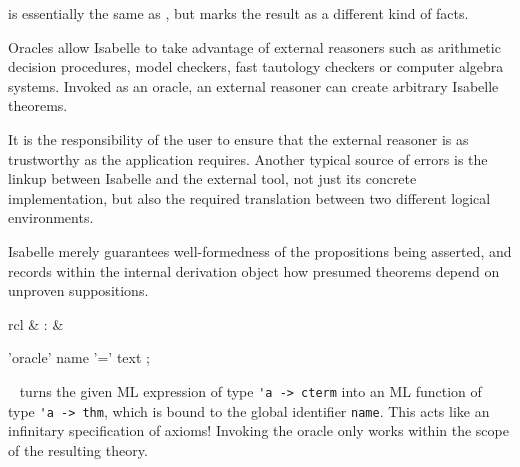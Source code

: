 \begin{isabellebody}
\begin{isamarkuptext}
\begin{description}
  \item \hyperlink{command.theorems}{\mbox{}} is essentially the same as \hyperlink{command.lemmas}{\mbox{}}, but marks the result as a different kind of facts.

  \end{description}%
\end{isamarkuptext}%
\isamarkuptrue%
%
\isamarkuptrue%
%
\begin{isamarkuptext}%
Oracles allow Isabelle to take advantage of external reasoners
  such as arithmetic decision procedures, model checkers, fast
  tautology checkers or computer algebra systems.  Invoked as an
  oracle, an external reasoner can create arbitrary Isabelle theorems.

  It is the responsibility of the user to ensure that the external
  reasoner is as trustworthy as the application requires.  Another
  typical source of errors is the linkup between Isabelle and the
  external tool, not just its concrete implementation, but also the
  required translation between two different logical environments.

  Isabelle merely guarantees well-formedness of the propositions being
  asserted, and records within the internal derivation object how
  presumed theorems depend on unproven suppositions.

  \begin{matharray}{rcl}
    \hypertarget{command.oracle}{\hyperlink{command.oracle}{\mbox{}}} & : &  \\
  \end{matharray}

  \begin{rail}
    'oracle' name '=' text
    ;
  \end{rail}

  \begin{description}

  \item \hyperlink{command.oracle}{\mbox{}}~ turns the given ML
  expression  of type \verb|'a -> cterm| into an
  ML function of type \verb|'a -> thm|, which is bound to the
  global identifier \verb|name|.  This acts like an infinitary
  specification of axioms!  Invoking the oracle only works within the
  scope of the resulting theory.


\end{description}
\end{isamarkuptext}
\end{isabellebody}
